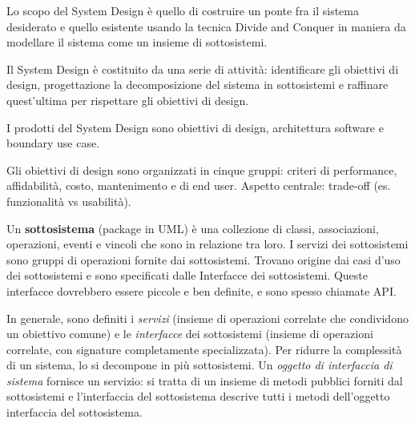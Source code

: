 \documentclass{article}
\begin{document}
        Lo scopo del System Design è quello di costruire un ponte fra il sistema desiderato e quello esistente usando la tecnica Divide and Conquer in maniera da modellare il sistema come un insieme di sottosistemi. 
        
        \vspace{3mm}
        
        Il System Design è costituito da una serie di attività: identificare gli obiettivi di design, progettazione la decomposizione del sistema in sottosistemi e raffinare quest’ultima per rispettare gli obiettivi di design. 
        
        \vspace{3mm}
        
        I prodotti del System Design sono obiettivi di design, architettura software e boundary use case. 
        
        \vspace{3mm}
        
        Gli obiettivi di design sono organizzati in cinque gruppi: criteri di performance, affidabilità, costo, mantenimento e di end user. Aspetto centrale: trade-off (es. funzionalità vs usabilità).
        
        \vspace{3mm}
        
        Un \textbf{sottosistema} (package in UML) è una collezione di classi, associazioni, operazioni, eventi e vincoli che sono in relazione tra loro. I servizi dei sottosistemi sono gruppi di operazioni fornite dai sottosistemi. Trovano origine dai casi d’uso dei sottosistemi e sono specificati dalle Interfacce dei sottosistemi. Queste interfacce dovrebbero essere piccole e ben definite, e sono spesso chiamate API. 
        
        \vspace{3mm}
        
        In generale, sono definiti i \textit{servizi} (insieme di operazioni correlate che condividono un obiettivo comune) e le \textit{interfacce} dei sottosistemi (insieme di operazioni correlate, con signature completamente specializzata).  Per ridurre la complessità di un sistema, lo si decompone in più sottosistemi.
        Un \textit{oggetto di interfaccia di sistema} fornisce un servizio: si tratta di un insieme di metodi pubblici forniti dal sottosistemi e l’interfaccia del sottosistema descrive tutti i metodi dell’oggetto interfaccia del sottosistema.
        
        \vspace{3mm}
        
\end{document}
